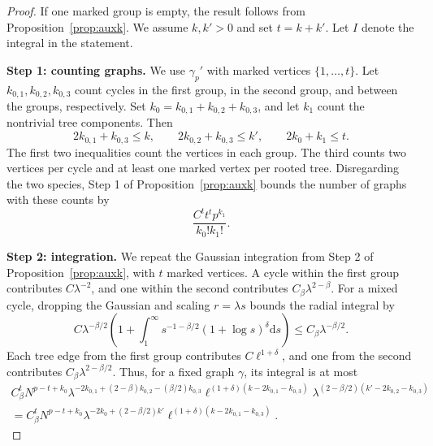 \documentclass[a4paper,10pt,leqno]{amsart}
\numberwithin{equation}{section}
\newcommand{\dd}{\mathrm{d}}
\begin{document}
\begin{proof}
  If one marked group is empty, the result follows from Proposition~\ref{prop:auxk}. We assume $k,k'>0$ and set $t=k+k'$. Let $I$ denote the integral in the statement.

  \noindent
  \textbf{Step 1: counting graphs.}
  We use $\gamma_p'$ with marked vertices $\{1,\ldots,t\}$. Let $k_{0,1},k_{0,2},k_{0,3}$ count cycles in the first group, in the second group, and between the groups, respectively. Set $k_0=k_{0,1}+k_{0,2}+k_{0,3}$, and let $k_1$ count the nontrivial tree components. Then
  \[
    2k_{0,1}+k_{0,3}\le k,\qquad
    2k_{0,2}+k_{0,3}\le k',\qquad
    2k_0+k_1\le t.
  \]
  The first two inequalities count the vertices in each group. The third counts two vertices per cycle and at least one marked vertex per rooted tree.
  Disregarding the two species, Step 1 of Proposition~\ref{prop:auxk} bounds the number of graphs with these counts by
  \[
    \frac{C^t t^t p^{k_1}}{k_0!k_1!}.
  \]

  \noindent
  \textbf{Step 2: integration.}
  We repeat the Gaussian integration from Step 2 of Proposition~\ref{prop:auxk}, with $t$ marked vertices. A cycle within the first group contributes $C\lambda^{-2}$, and one within the second contributes $C_\beta\lambda^{2-\beta}$. For a mixed cycle, dropping the Gaussian and scaling $r=\lambda s$ bounds the radial integral by
  \[
    C\lambda^{-\beta/2}\left(1+\int_1^\infty s^{-1-\beta/2}(1+\log s)^\delta\dd s\right)
    \le C_\beta\lambda^{-\beta/2}.
  \]
  Each tree edge from the first group contributes $C\ell^{1+\delta}$, and one from the second contributes $C_\beta\lambda^{2-\beta/2}$. Thus, for a fixed graph $\gamma$, its integral is at most
  \begin{multline*}
    C_\beta^tN^{p-t+k_0}
    \lambda^{-2k_{0,1}+(2-\beta)k_{0,2}-(\beta/2)k_{0,3}}
    \ell^{(1+\delta)(k-2k_{0,1}-k_{0,3})}
    \lambda^{(2-\beta/2)(k'-2k_{0,2}-k_{0,3})}\\
    =C_\beta^tN^{p-t+k_0}\lambda^{-2k_0+(2-\beta/2)k'}
    \ell^{(1+\delta)(k-2k_{0,1}-k_{0,3})}.
  \end{multline*}


\end{proof}
\end{document}
